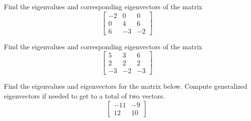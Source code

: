 \documentclass{ximera}
\begin{document}
\begin{exercise}%
    Find the eigenvalues and corresponding eigenvectors of the matrix 
    \[ \begin{bmatrix} -2 & 0 & 0 \\ 0 & 4 & 6 \\ 6 & -3 & -2 \end{bmatrix} \]
\end{exercise}

\begin{exercise}%
    Find the eigenvalues and corresponding eigenvectors of the matrix 
    \[ \begin{bmatrix} 5 & 3 & 6 \\ 2 & 2 & 2 \\ -3 & -2 & -3 \end{bmatrix} \]
\end{exercise}

\begin{exercise}%
    Find the eigenvalues and eigenvectors for the matrix below. Compute generalized eigenvectors if needed to get to a total of two vectors. 
    \[ \begin{bmatrix} -11 & -9 \\ 12 & 10 \end{bmatrix} \]
\end{exercise}
\end{document}
